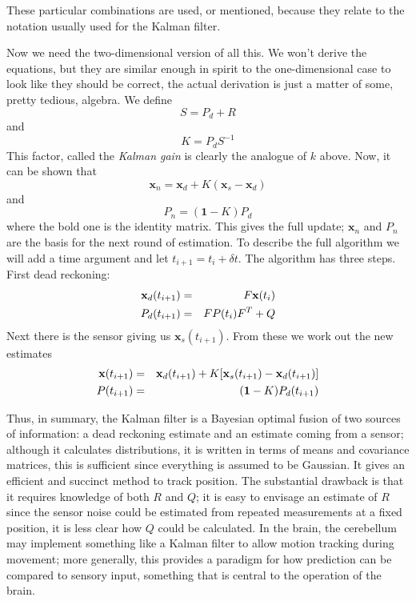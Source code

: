 \documentclass{article}
\begin{document}
These particular combinations are used, or mentioned, because they relate to the
notation usually used for the Kalman filter.


Now we need the two-dimensional version of all this. We won't derive
the equations, but they are similar enough in spirit to the
one-dimensional case to look like they should be correct, the actual
derivation is just a matter of some, pretty tedious, algebra. We define
\begin{equation}
S=P_d+R
\end{equation}
and
\begin{equation}
K=P_dS^{-1}
\end{equation}
This factor, called the \textsl{Kalman gain} is clearly the analogue of $k$ above. Now, it can be shown that
\begin{equation}
\mathbf{x}_n=\mathbf{x}_d+K(\mathbf{x}_s-\mathbf{x}_d)
\end{equation}
and 
\begin{equation}
P_n=(\textbf{1}-K)P_d
\end{equation}
where the bold one is the identity matrix. This gives the full update;
$\mathbf{x}_n$ and $P_n$ are the basis for the next round of
estimation. To describe the full algorithm we will add a time argument
and let $t_{i+1}=t_i+\delta t$. The algorithm has three steps. First
dead reckoning:
\begin{eqnarray}
\textbf{x}_d(t_{i+1})&=&F\textbf{x}(t_i)\cr
P_d(t_{i+1})&=&FP(t_i)F^{T}+Q
\end{eqnarray}
Next there is the sensor giving us $\mathbf{x}_s(t_{i+1})$. From these we work out the new estimates
\begin{eqnarray}
\textbf{x}(t_{i+1})&=&\mathbf{x}_d(t_{i+1})+K[\mathbf{x}_s(t_{i+1})-\mathbf{x}_d(t_{i+1})]\cr
P(t_{i+1})&=&(\textbf{1}-K)P_d(t_{i+1})
\end{eqnarray}

Thus, in summary, the Kalman filter is a Bayesian optimal fusion of
two sources of information: a dead reckoning estimate and an estimate
coming from a sensor; although it calculates distributions, it is
written in terms of means and covariance matrices, this is sufficient
since everything is assumed to be Gaussian. It gives an efficient and
succinct method to track position. The substantial drawback is that it
requires knowledge of both $R$ and $Q$; it is easy to envisage an
estimate of $R$ since the sensor noise could be estimated from
repeated measurements at a fixed position, it is less clear how $Q$
could be calculated. In the brain, the cerebellum may implement something like a Kalman filter to allow motion tracking during movement; more generally, this provides a paradigm for how prediction can be compared to sensory input, something that is central to the operation of the brain.


{}
\end{document}
